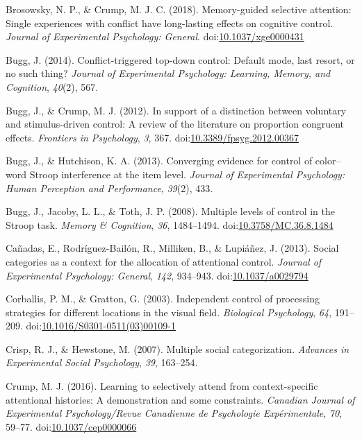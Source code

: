 \documentclass[english,,man,floatsintext]{apa6}
\begin{document}
\hypertarget{ref-brosowsky_memory-guided_2018}{}
Brosowsky, N. P., \& Crump, M. J. C. (2018). Memory-guided selective
attention: Single experiences with conflict have long-lasting effects on
cognitive control. \emph{Journal of Experimental Psychology: General}.
doi:\href{https://doi.org/10.1037/xge0000431}{10.1037/xge0000431}

\hypertarget{ref-bugg_conflict-triggered_2014}{}
Bugg, J. (2014). Conflict-triggered top-down control: Default mode, last
resort, or no such thing? \emph{Journal of Experimental Psychology:
Learning, Memory, and Cognition}, \emph{40}(2), 567.

\hypertarget{ref-bugg_support_2012}{}
Bugg, J., \& Crump, M. J. (2012). In support of a distinction between
voluntary and stimulus-driven control: A review of the literature on
proportion congruent effects. \emph{Frontiers in Psychology}, \emph{3},
367.
doi:\href{https://doi.org/10.3389/fpsyg.2012.00367}{10.3389/fpsyg.2012.00367}

\hypertarget{ref-bugg_converging_2013}{}
Bugg, J., \& Hutchison, K. A. (2013). Converging evidence for control of
color--word Stroop interference at the item level. \emph{Journal of
Experimental Psychology: Human Perception and Performance},
\emph{39}(2), 433.

\hypertarget{ref-bugg_multiple_2008}{}
Bugg, J., Jacoby, L. L., \& Toth, J. P. (2008). Multiple levels of
control in the Stroop task. \emph{Memory \& Cognition}, \emph{36},
1484--1494.
doi:\href{https://doi.org/10.3758/MC.36.8.1484}{10.3758/MC.36.8.1484}

\hypertarget{ref-canadas_social_2013}{}
Cañadas, E., Rodríguez-Bailón, R., Milliken, B., \& Lupiáñez, J. (2013).
Social categories as a context for the allocation of attentional
control. \emph{Journal of Experimental Psychology: General}, \emph{142},
934--943. doi:\href{https://doi.org/10.1037/a0029794}{10.1037/a0029794}

\hypertarget{ref-corballis_independent_2003}{}
Corballis, P. M., \& Gratton, G. (2003). Independent control of
processing strategies for different locations in the visual field.
\emph{Biological Psychology}, \emph{64}, 191--209.
doi:\href{https://doi.org/10.1016/S0301-0511(03)00109-1}{10.1016/S0301-0511(03)00109-1}

\hypertarget{ref-crisp_multiple_2007}{}
Crisp, R. J., \& Hewstone, M. (2007). Multiple social categorization.
\emph{Advances in Experimental Social Psychology}, \emph{39}, 163--254.

\hypertarget{ref-crump_learning_2016}{}
Crump, M. J. (2016). Learning to selectively attend from
context-specific attentional histories: A demonstration and some
constraints. \emph{Canadian Journal of Experimental Psychology/Revue
Canadienne de Psychologie Expérimentale}, \emph{70}, 59--77.
doi:\href{https://doi.org/10.1037/cep0000066}{10.1037/cep0000066}
\end{document}
